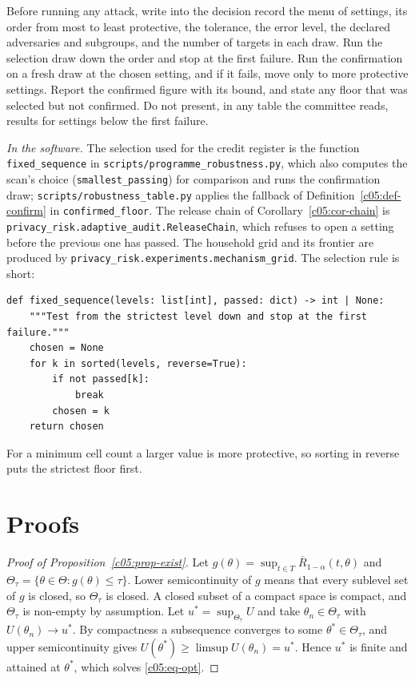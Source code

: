 \begin{inpractice}\sloppy
Before running any attack, write into the decision record the menu of settings, its order
from most to least protective, the tolerance, the error level, the declared adversaries
and subgroups, and the number of targets in each draw. Run the selection draw down the
order and stop at the first failure. Run the confirmation on a fresh draw at the chosen
setting, and if it fails, move only to more protective settings. Report the confirmed
figure with its bound, and state any floor that was selected but not confirmed. Do not
present, in any table the committee reads, results for settings below the first failure.

\smallskip\noindent\textit{In the software.} The selection used for the credit register
is the function \texttt{fixed\_sequence} in \texttt{scripts/programme\_robustness.py},
which also computes the scan's choice (\texttt{smallest\_passing}) for comparison and runs
the confirmation draw; \texttt{scripts/robustness\_table.py} applies the fallback of
Definition~\ref{c05:def-confirm} in \texttt{confirmed\_floor}. The release chain of
Corollary~\ref{c05:cor-chain} is \texttt{privacy\_risk.adaptive\_audit.ReleaseChain},
which refuses to open a setting before the previous one has passed. The household grid
and its frontier are produced by \texttt{privacy\_risk.experiments.mechanism\_grid}. The
selection rule is short:
\begin{lstlisting}
def fixed_sequence(levels: list[int], passed: dict) -> int | None:
    """Test from the strictest level down and stop at the first failure."""
    chosen = None
    for k in sorted(levels, reverse=True):
        if not passed[k]:
            break
        chosen = k
    return chosen
\end{lstlisting}
For a minimum cell count a larger value is more protective, so sorting in reverse puts
the strictest floor first.
\end{inpractice}

\section{Proofs}

\begin{proof}[Proof of Proposition~\ref{c05:prop-exist}]
Let $g(\theta) = \sup_{t\in T}\overline{R}_{1-\alpha}(t,\theta)$ and
$\Theta_\tau = \{\theta \in \Theta : g(\theta) \le \tau\}$. Lower semicontinuity of $g$
means that every sublevel set of $g$ is closed, so $\Theta_\tau$ is closed. A closed
subset of a compact space is compact, and $\Theta_\tau$ is non-empty by assumption. Let
$u^\ast = \sup_{\Theta_\tau}U$ and take $\theta_n \in \Theta_\tau$ with
$U(\theta_n) \to u^\ast$. By compactness a subsequence converges to some
$\theta^\ast \in \Theta_\tau$, and upper semicontinuity gives
$U(\theta^\ast) \ge \limsup U(\theta_n) = u^\ast$. Hence $u^\ast$ is finite and attained
at $\theta^\ast$, which solves \eqref{c05:eq-opt}.
\end{proof}

